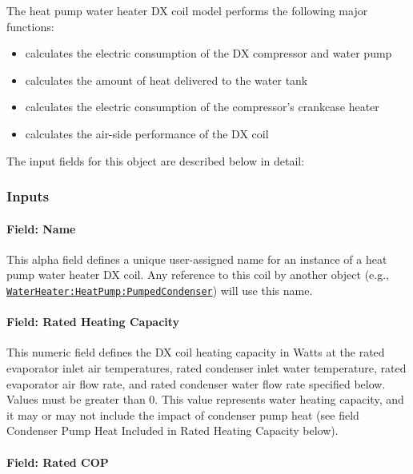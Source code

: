 The heat pump water heater DX coil model performs the following major functions:

\begin{itemize}
\item
  calculates the electric consumption of the DX compressor and water pump
\item
  calculates the amount of heat delivered to the water tank
\item
  calculates the electric consumption of the compressor's crankcase heater
\item
  calculates the air-side performance of the DX coil
\end{itemize}

The input fields for this object are described below in detail:

\subsubsection{Inputs}\label{inputs-27}

\paragraph{Field: Name}\label{field-name-26-000}

This alpha field defines a unique user-assigned name for an instance of a heat pump water heater DX coil. Any reference to this coil by another object (e.g., \hyperref[waterheaterheatpumppumpedcondenser]{\lstinline!WaterHeater:HeatPump:PumpedCondenser!}) will use this name.

\paragraph{Field: Rated Heating Capacity}\label{field-rated-heating-capacity}

This numeric field defines the DX coil heating capacity in Watts at the rated evaporator inlet air temperatures, rated condenser inlet water temperature, rated evaporator air flow rate, and rated condenser water flow rate specified below. Values must be greater than 0. This value represents water heating capacity, and it may or may not include the impact of condenser pump heat (see field Condenser Pump Heat Included in Rated Heating Capacity below).

\paragraph{Field: Rated COP}\label{field-rated-cop}

